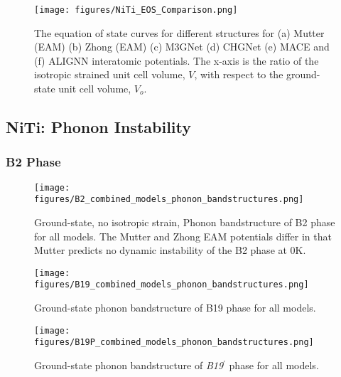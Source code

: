 \documentclass[preprint]{elsarticle}
\begin{document}
\begin{figure}[ht!]
    \begin{centering}
        \texttt{[image: figures/NiTi\_EOS\_Comparison.png]}
        \caption{
            The equation of state curves for different  structures for (a) Mutter (EAM) (b) Zhong (EAM) (c) M3GNet (d) CHGNet (e) MACE and (f) ALIGNN interatomic potentials. The x-axis is the ratio of the isotropic strained unit cell volume, $V$,  with respect to the ground-state unit cell volume, $V_o$.
        }
        \label{fig:eos}
    \end{centering}
\end{figure}

\subsection{NiTi: Phonon Instability}
\label{subsec:niphonons}


\subsubsection{B2 Phase}
\label{subsubsec:b2}

\begin{figure}[ht!]
    \begin{centering}
        \texttt{[image: figures/B2\_combined\_models\_phonon\_bandstructures.png]}
        \caption{
          Ground-state, no isotropic strain, Phonon bandstructure of B2 phase for all models. The Mutter and Zhong EAM potentials differ in that Mutter predicts no dynamic instability of the B2 phase at 0K. 
        }
        \label{fig:allmodels_no_strainphonon_b2}
    \end{centering}
\end{figure}

\begin{figure}[ht!]
    \begin{centering}
        \texttt{[image: figures/B19\_combined\_models\_phonon\_bandstructures.png]}
        \caption{
          Ground-state phonon bandstructure of B19 phase for all models.
        }
        \label{fig:allmodels_no_strainphonon_B19P}
    \end{centering}
\end{figure}

\begin{figure}[ht!]
    \begin{centering}
        \texttt{[image: figures/B19P\_combined\_models\_phonon\_bandstructures.png]}
        \caption{
          Ground-state phonon bandstructure of \textit{B19}$^\prime$ phase for all models.
        }
        \label{fig:allmodels_no_strainphonon_B19P}
    \end{centering}
\end{figure}
\end{document}
